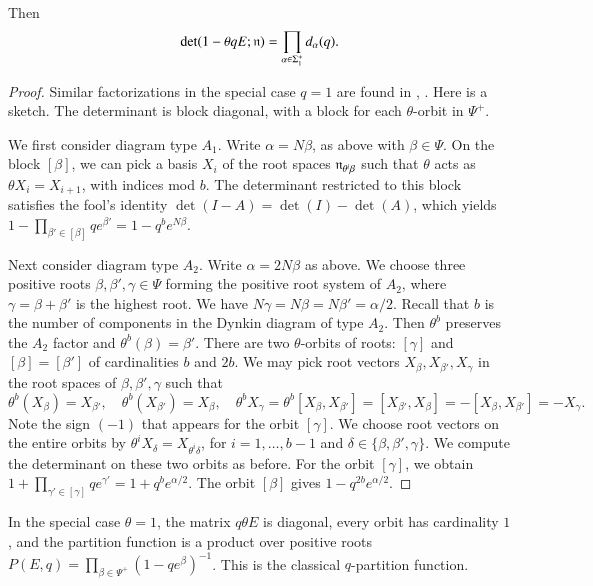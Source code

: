 \begin{lemma} \label{lemma:prod}
Then
\[
\det(1-\theta  q E;{\mathfrak n}) = \prod_{\alpha\in\Sigma^+_1} d_\alpha(q).
\]
\end{lemma}

\begin{proof} Similar factorizations in the special case $q=1$
are found in \cite{jantzen1977darstellungen}, \cite{wendt2001weyl}.  Here is a sketch.
The determinant is block diagonal, with a block for each $\theta$-orbit in $\Psi^+$.

We first consider diagram type $A_1$.
Write $\alpha = N\beta$, as above with $\beta\in\Psi$.
On the block $[\beta]$, we can pick a basis $X_i$ of the
root spaces ${\mathfrak n}_{\theta^i\beta}$ such that $\theta$ acts as $\theta X_i = X_{i+1}$, with indices mod $b$.
The determinant restricted  to this block satisfies the fool's identity $\det(I-A) = \det(I)-\det(A)$, which yields
$1- \prod_{\beta'\in [\beta]} {q e^{\beta'}} = 1- q^b e^{N \beta}$.

Next consider diagram type $A_2$.  Write $\alpha = 2N\beta$ as above.
We choose three positive roots
$\beta,\beta',\gamma\in\Psi$ forming the positive root system of $A_2$, where $\gamma=\beta+\beta'$ is 
the highest root.  
We have $N\gamma=N\beta=N\beta'=\alpha/2$.
Recall that $b$ is the number of components in the Dynkin diagram of type $A_2$.
Then $\theta^b$ preserves the $A_2$ factor and $\theta^b(\beta)=\beta'$.
There are two $\theta$-orbits of roots: $[\gamma]$ and $[\beta]=[\beta']$ of cardinalities $b$ and $2b$.
We may pick root vectors $X_{\beta},X_{\beta'},X_{\gamma}$ in the root spaces of $\beta,\beta',\gamma$ such that 
\[
\theta^b(X_\beta)= X_{\beta'},\quad \theta^b(X_{\beta'})=X_\beta,\quad
\theta^b X_\gamma = \theta^b [X_\beta,X_{\beta'}] = [X_{\beta'},X_\beta] = -[X_\beta,X_{\beta'}] = -X_\gamma.
\]
Note the sign $(-1)$ that appears for the orbit $[\gamma]$.
We choose root vectors on the entire orbits by $\theta^i X_\delta=X_{\theta^i \delta}$, for $i=1,\ldots,b-1$ and
$\delta\in\{\beta,\beta',\gamma\}$.
We compute the determinant on these two orbits as before.  
For the orbit $[\gamma]$, we obtain
 $1+\prod_{\gamma'\in [\gamma]} {q e^{\gamma'}} = 1+ q^b e^{\alpha/2}$.
The orbit $[\beta]$ gives $1-q^{2b} e^{\alpha/2}$.
\end{proof}


In the special case $\theta=1$, the matrix $q \theta E$ is diagonal, every orbit has cardinality $1$,
and the partition function
is a product over positive roots 
$P(E,q) = \prod_{\beta\in\Psi^+} (1- q e^\beta)^{-1}$.  This is the classical $q$-partition function.


